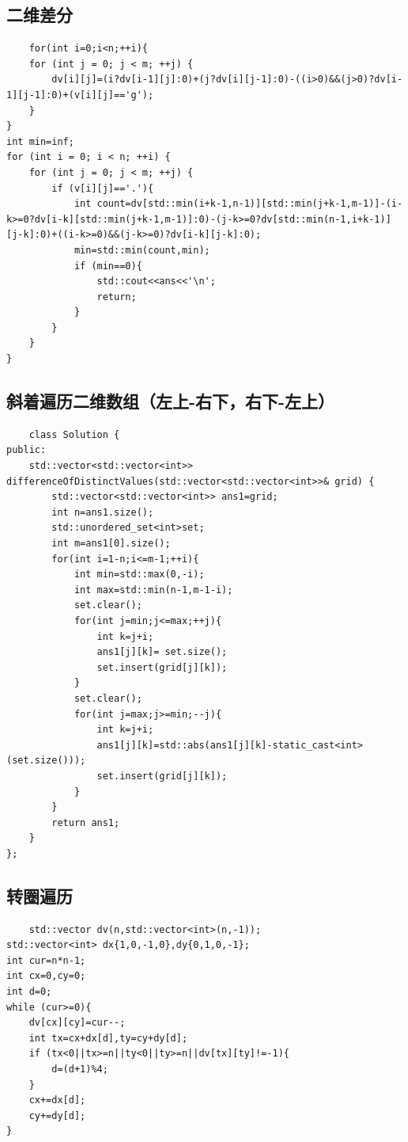 \documentclass[UTF8,twoside]{ctexart}
\begin{document}
\subsection{二维差分}
\begin{lstlisting}
    for(int i=0;i<n;++i){
    for (int j = 0; j < m; ++j) {
        dv[i][j]=(i?dv[i-1][j]:0)+(j?dv[i][j-1]:0)-((i>0)&&(j>0)?dv[i-1][j-1]:0)+(v[i][j]=='g');
    }
}
int min=inf;
for (int i = 0; i < n; ++i) {
    for (int j = 0; j < m; ++j) {
        if (v[i][j]=='.'){
            int count=dv[std::min(i+k-1,n-1)][std::min(j+k-1,m-1)]-(i-k>=0?dv[i-k][std::min(j+k-1,m-1)]:0)-(j-k>=0?dv[std::min(n-1,i+k-1)][j-k]:0)+((i-k>=0)&&(j-k>=0)?dv[i-k][j-k]:0);
            min=std::min(count,min);
            if (min==0){
                std::cout<<ans<<'\n';
                return;
            }
        }
    }
}
\end{lstlisting}
\subsection{斜着遍历二维数组（左上-右下，右下-左上）}
\begin{lstlisting}
    class Solution {
public:
    std::vector<std::vector<int>> differenceOfDistinctValues(std::vector<std::vector<int>>& grid) {
        std::vector<std::vector<int>> ans1=grid;
        int n=ans1.size();
        std::unordered_set<int>set;
        int m=ans1[0].size();
        for(int i=1-n;i<=m-1;++i){
            int min=std::max(0,-i);
            int max=std::min(n-1,m-1-i);
            set.clear();
            for(int j=min;j<=max;++j){
                int k=j+i;
                ans1[j][k]= set.size();
                set.insert(grid[j][k]);
            }
            set.clear();
            for(int j=max;j>=min;--j){
                int k=j+i;
                ans1[j][k]=std::abs(ans1[j][k]-static_cast<int>(set.size()));
                set.insert(grid[j][k]);
            }
        }
        return ans1;
    }
};
\end{lstlisting}
\subsection{转圈遍历}
\begin{lstlisting}
    std::vector dv(n,std::vector<int>(n,-1));
std::vector<int> dx{1,0,-1,0},dy{0,1,0,-1};
int cur=n*n-1;
int cx=0,cy=0;
int d=0;
while (cur>=0){
    dv[cx][cy]=cur--;
    int tx=cx+dx[d],ty=cy+dy[d];
    if (tx<0||tx>=n||ty<0||ty>=n||dv[tx][ty]!=-1){
        d=(d+1)%4;
    }
    cx+=dx[d];
    cy+=dy[d];
}
\end{lstlisting}
\end{document}
